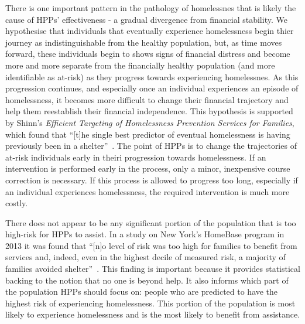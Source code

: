 \documentclass[10pt,letterpaper]{article}
\newcommand{\red}[1]{{\color{red}{#1}}}
\begin{document}
There is one important pattern in the pathology of homelessnes that is likely the cause of HPPs' effectiveness - a gradual divergence from financial stability. We hypothesise that individuals that eventually experience homelessness begin thier journey as indistinguishable from the healthy population, but, as time moves forward, these individuals begin to shows signs of financial distress and become more and more separate from the financially healthy population (and more identifiable as at-risk) as they progress towards experiencing homelessnes. As this progression continues, and especially once an individual experiences an episode of homelessness, it becomes more difficult to change their financial trajectory and help them reestablish their financial independence. This hypothesis is supported by Shinn's \textit{Efficient Targeting of Homelessness Prevention Services for Families}, which found that ``[t]he single best predictor of eventual homelessness is having previously been in a shelter''~\cite{shinn2019homelessness}. The point of HPPs is to change the trajectories of at-risk individuals early in theiri progression towards homelessness. If an intervention is performed early in the process, only a minor, inexpensive course correction is necessary. If this process is allowed to progress too long, especially if an individual experiences homelessness, the required intervention is much more costly. \red{add source?}

\red{better transition}
There does not appear to be any significant portion of the population that is too high-risk for HPPs to assist. In a study on New York's HomeBase program in 2013 it was found that ``[n]o level of risk was too high for families to benefit from services and, indeed, even in the highest decile of measured risk, a majority of families avoided shelter''~\cite{shinn2013efficient}. This finding is important because it provides statistical backing to the notion that no one is beyond help. It also informs which part of the population HPPs should focus on: people who are predicted to have the highest risk of experiencing homelessness. This portion of the population is most likely to experience homelessness and is the most likely to benefit from assistance.
\end{document}
